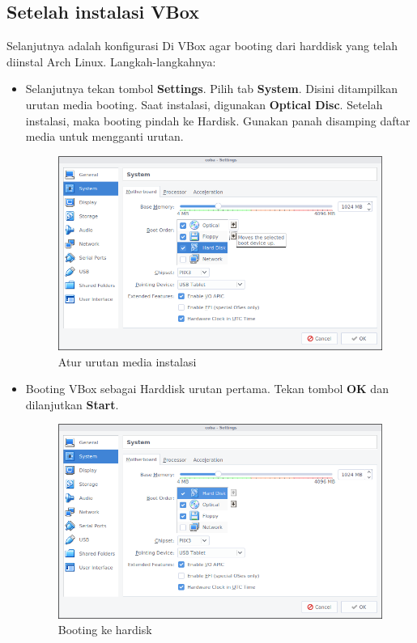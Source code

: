 \documentclass[12pt,]{article}
\begin{document}
	\subsection{Setelah instalasi VBox}
	Selanjutnya adalah konfigurasi Di VBox agar booting dari harddisk yang telah diinstal Arch Linux.
	Langkah-langkahnya:
	\begin{itemize}
		\item Selanjutnya tekan tombol \textbf{Settings}. Pilih tab \textbf{System}.
		Disini ditampilkan urutan media booting.
		Saat instalasi, digunakan \textbf{Optical Disc}.
		Setelah instalasi, maka booting pindah ke Hardisk.
		Gunakan panah disamping daftar media untuk mengganti urutan.
		\begin{figure}[H]
			\centering
			\includegraphics[width=0.6\linewidth]{images/vbox_afterinstall/s1}
			\caption{Atur urutan media instalasi}
		\end{figure}

		\item Booting VBox sebagai Harddisk urutan pertama.
		Tekan tombol \textbf{OK} dan dilanjutkan \textbf{Start}.
			\begin{figure}[H]
			\centering
			\includegraphics[width=0.6\linewidth]{images/vbox_afterinstall/s2}
			\caption{Booting ke hardisk}
		\end{figure}


\end{itemize}
\end{document}
